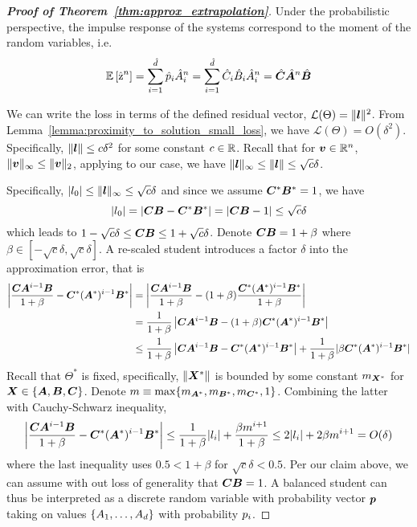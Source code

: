 \begin{proof}[\textbf{Proof of Theorem~\ref{thm:approx_extrapolation}}]
Under the probabilistic perspective, the impulse response of the systems correspond to the moment of the random variables, i.e.
\begin{equation}
    \mathbb{E}\left[\hat{{\textnormal{z}}}^n\right]=\sum_{i=1}^{\hat{d}} \hat{{p}}_i \hat{{A}}_i^n = \sum_{i=1}^{\hat{d}} \hat{{C}}_i\hat{{B}}_i \hat{{A}}_i^n=\hat{{\bm{C}}}\hat{{\bm{A}}}^n\hat{{\bm{B}}}
\end{equation}

We can write the loss in terms of the defined residual vector, $\mathcal{L}(\Theta)=\|{\bm{l}}\|^2$. From Lemma~\ref{lemma:proximity_to_solution_small_loss}, we have $\mathcal{L}(\Theta)=O(\delta^2)$. Specifically, $\|{\bm{l}}\|\le c\delta^2$ for some constant $c\in\mathbb{R}$. Recall that for ${\bm{v}}\in\mathbb{R}^n$, $\|{\bm{v}}\|_{\infty}\le \|{\bm{v}}\|_2$, applying to our case, we have $\|{\bm{l}}\|_{\infty}\le \|{\bm{l}}\|\le \sqrt{c}\delta$.

Specifically, $|{l}_0|\le \|{\bm{l}}\|_{\infty}\le \sqrt{c}\delta$ and since we assume ${\bm{C}}^*{\bm{B}}^*=1$, we have 
\begin{equation}
    |{l}_0|=|{\bm{C}}{\bm{B}}-{\bm{C}}^*{\bm{B}}^*|=|{\bm{C}}{\bm{B}}-1|\le \sqrt{c}\delta
\end{equation}
which leads to $1-\sqrt{c}\delta\le {\bm{C}}{\bm{B}}\le 1+\sqrt{c}\delta$. Denote ${\bm{C}}{\bm{B}}=1+\beta$ where $\beta\in\left[-\sqrt{c}\delta,\sqrt{c}\delta\right]$. A re-scaled student introduces a factor $\delta$ into the approximation error, that is
\begin{align}
    \left|\frac{{\bm{C}}{\bm{A}}^{i-1}{\bm{B}}}{1+\beta} - {\bm{C}}^*({\bm{A}}^*)^{i-1}{\bm{B}}^*\right| & =\left|\frac{{\bm{C}}{\bm{A}}^{i-1}{\bm{B}}}{1+\beta} - (1+\beta)\frac{{\bm{C}}^*({\bm{A}}^*)^{i-1}{\bm{B}}^*}{1+\beta}\right|\\
    & = \frac{1}{1+\beta}\left| {\bm{C}}{\bm{A}}^{i-1}{\bm{B}} - (1+\beta){\bm{C}}^*({\bm{A}}^*)^{i-1}{\bm{B}}^* \right|\\
    & \le \frac{1}{1+\beta}\left| {\bm{C}}{\bm{A}}^{i-1}{\bm{B}} - {\bm{C}}^*({\bm{A}}^*)^{i-1}{\bm{B}}^* \right|+\frac{1}{1+\beta}|\beta{\bm{C}}^*({\bm{A}}^*)^{i-1}{\bm{B}}^*|
\end{align}
Recall that $\Theta^*$ is fixed, specifically, $\|{\bm{X}}^*\|$ is bounded by some constant $m_{{\bm{X}}^*}$ for ${\bm{X}}\in\{{\bm{A}},{\bm{B}},{\bm{C}}\}$. Denote $m\equiv\max\{m_{{\bm{A}}^*}, m_{{\bm{B}}^*}, m_{{\bm{C}}^*},1 \}$. Combining the latter with Cauchy-Schwarz inequality,
\begin{equation}
    \left|\frac{{\bm{C}}{\bm{A}}^{i-1}{\bm{B}}}{1+\beta} - {\bm{C}}^*({\bm{A}}^*)^{i-1}{\bm{B}}^*\right|\le \frac{1}{1+\beta}|{l}_{i}|+\frac{\beta m^{i+1}}{1+\beta} \le 2|{l}_i|+2\beta m^{i+1}=O(\delta)
\end{equation}
where the last inequality uses $0.5<1+\beta$ for $\sqrt{c}\delta<0.5$. Per our claim above, we can assume with out loss of generality that ${\bm{C}}{\bm{B}}=1$. A balanced student can thus be interpreted as a discrete random variable with probability vector ${\bm{p}}$ taking on values $\{{A}_1,\dots,{A}_d\}$ with probability ${p}_i$.


\end{proof}
